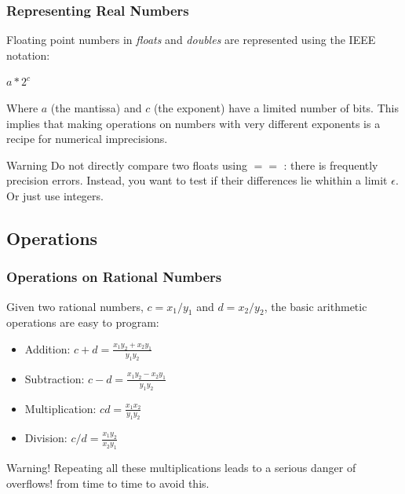 \documentclass{beamer}
\begin{document}
\begin{frame}
  \frametitle{Representing Real Numbers} 

  Floating point numbers in \emph{floats} and \emph{doubles} are
  represented using the IEEE notation:
  \smallskip

  \begin{center}
    $a*2^c$
  \end{center}
  \smallskip

  Where $a$ (the mantissa) and $c$ (the exponent) have a limited
  number of bits. This implies that making operations on numbers with
  very different exponents is a recipe for numerical imprecisions.
  \bigskip
  
  \begin{block}{Warning}
    Do not directly compare two floats using $==$ : there is
    frequently precision errors. Instead, you want to test if their
    differences lie whithin a limit $\epsilon$. Or just use integers.
  \end{block}
\end{frame}

\subsection{Operations}

\begin{frame}
  \frametitle{Operations on Rational Numbers}
  \begin{block}{}
    Given two rational numbers, $c = x_1/y_1$ and $d = x_2/y_2$, the
    basic arithmetic operations are easy to program:
  \end{block}
  \begin{itemize}
  \item Addition: $c+d = \frac{x_1y_2 + x_2y_1}{y_1y_2}$
  \item Subtraction: $c-d = \frac{x_1y_2 - x_2y_1}{y_1y_2}$
  \item Multiplication: $cd = \frac{x_1x_2}{y_1y_2}$
  \item Division: $c/d = \frac{x_1y_2}{x_2y_1}$
  \end{itemize}
  \begin{block}{Warning!}
    Repeating all these multiplications leads to a serious danger of
    overflows!  from time to time to
    avoid this.
  \end{block}
  
\end{frame}
\end{document}
